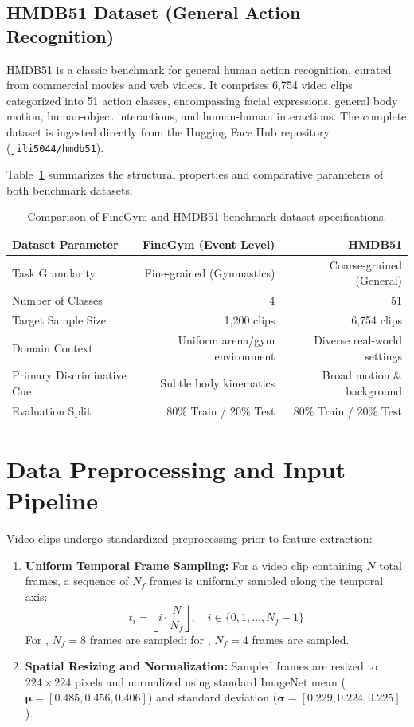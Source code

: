 \subsection{HMDB51 Dataset (General Action Recognition)}
HMDB51 is a classic benchmark for general human action recognition, curated from commercial movies and web videos. It comprises 6,754 video clips categorized into 51 action classes, encompassing facial expressions, general body motion, human-object interactions, and human-human interactions. The complete dataset is ingested directly from the Hugging Face Hub repository (\texttt{jili5044/hmdb51}).

Table~\ref{tab:dataset_comparison} summarizes the structural properties and comparative parameters of both benchmark datasets.

\begin{table}[H]
\centering
\caption{Comparison of FineGym and HMDB51 benchmark dataset specifications.}
\label{tab:dataset_comparison}
\begin{tabular}{lrr}
\toprule
\textbf{Dataset Parameter} & \textbf{FineGym (Event Level)} & \textbf{HMDB51} \\
\midrule
Task Granularity & Fine-grained (Gymnastics) & Coarse-grained (General) \\
Number of Classes & 4 & 51 \\
Target Sample Size & 1,200 clips & 6,754 clips \\
Domain Context & Uniform arena/gym environment & Diverse real-world settings \\
Primary Discriminative Cue & Subtle body kinematics & Broad motion \& background \\
Evaluation Split & 80\% Train / 20\% Test & 80\% Train / 20\% Test \\
\bottomrule
\end{tabular}
\end{table}

\section{Data Preprocessing and Input Pipeline}

Video clips undergo standardized preprocessing prior to feature extraction:
\begin{enumerate}[leftmargin=*]
    \item \textbf{Uniform Temporal Frame Sampling:} For a video clip containing $N$ total frames, a sequence of $N_f$ frames is uniformly sampled along the temporal axis:
    \begin{equation*}
        t_i = \left\lfloor i \cdot \frac{N}{N_f} \right\rfloor, \quad i \in \{0, 1, \dots, N_f - 1\}
    \end{equation*}
    For \vjepaa{}, $N_f = 8$ frames are sampled; for \qwenvl{}, $N_f = 4$ frames are sampled.
    \item \textbf{Spatial Resizing and Normalization:} Sampled frames are resized to $224 \times 224$ pixels and normalized using standard ImageNet mean ($\boldsymbol{\mu} = [0.485, 0.456, 0.406]$) and standard deviation ($\boldsymbol{\sigma} = [0.229, 0.224, 0.225]$).
\end{enumerate}

